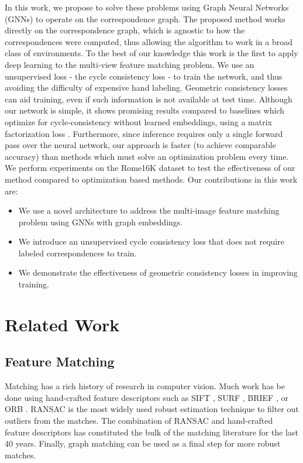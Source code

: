 \documentclass[10pt,twocolumn,letterpaper]{article}
\begin{document}
In this work, we propose to solve these problems using Graph Neural Networks (GNNs) to operate on the correspondence graph.
The proposed method works directly on the correspondence graph, which is agnostic to how the correspondences were computed, thus allowing the algorithm to work in a broad class of environments.
To the best of our knowledge this work is the first to apply deep learning to the multi-view feature matching problem.
We use an unsupervised loss - the cycle consistency loss - to train the network, and thus avoiding the difficulty of expensive hand labeling.
Geometric consistency losses can aid training, even if such information is not available at test time.
Although our network is simple, it shows promising results compared to baselines which optimize for cycle-consistency without learned embeddings, using a matrix factorization loss \cite{zhou2015multi, leonardos2016distributed}.
Furthermore, since inference requires only a single forward pass over the neural network, our approach is faster (to achieve comparable accuracy) than methods which must solve an optimization problem every time.
We perform experiments on the Rome16K \cite{li2010location} dataset to test the effectiveness of our method compared to optimization based methods.
Our contributions in this work are:
\begin{itemize}
\item We use a novel architecture to address the multi-image feature matching problem using GNNs with graph embeddings.
\item We introduce an unsupervised cycle consistency loss that does not require labeled correspondences to train.
\item We demonstrate the effectiveness of geometric consistency losses in improving training.
\end{itemize}


\section{Related Work}

\subsection{Feature Matching}
Matching has a rich history of research in computer vision.
Much work has be done using hand-crafted feature descriptors such as SIFT \cite{lowe2004distinctive}, SURF \cite{bay2006surf}, BRIEF \cite{calonder2012brief}, or ORB \cite{mur2015orb}.
RANSAC \cite{fischler1981random} is the most widely used robust estimation technique to filter out outliers from the matches.
The combination of RANSAC and hand-crafted feature descriptors has constituted the bulk of the matching literature for the last 40 years.
Finally, graph matching \cite{suh2015subgraph, hu2016distributable} can be used as a final step for more robust matches.
\end{document}
